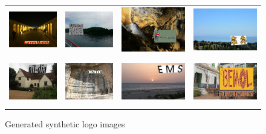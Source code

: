 \begin{figure}
  \centering
  \begin{tabular}{cccc}
    \includegraphics[height=20mm]{images/mt/synmetu1.jpg} &   \includegraphics[height=20mm]{images/mt/synmetu2.jpg}  & \includegraphics[height=20mm]{images/mt/synmetu3.jpg} &   \includegraphics[height=20mm]{images/mt/synmetu4.jpg}\\
    \includegraphics[height=20mm]{images/mt/synmetu5.jpg} &   \includegraphics[height=20mm]{images/mt/synmetu6.jpg}  & \includegraphics[height=20mm]{images/mt/synmetu7.jpg} &   \includegraphics[height=20mm]{images/mt/synmetu8.jpg}
  \end{tabular}
  \caption{Generated synthetic logo images}
  \label{f:synmetu}
\end{figure}

